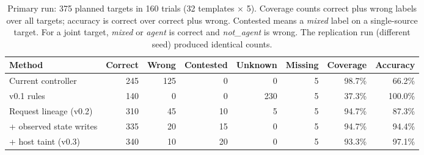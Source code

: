 \begin{table}[tb]
\centering\small
\setlength{\tabcolsep}{5pt}
\begin{tabular}{@{}lrrrrrrr@{}}
\toprule
Method & Correct & Wrong & Contested & Unknown & Missing & Coverage & Accuracy \\
\midrule
Current controller & 245 & 125 & 0 & 0 & 5 & 98.7\% & 66.2\% \\
v0.1 rules & 140 & 0 & 0 & 230 & 5 & 37.3\% & 100.0\% \\
Request lineage (v0.2) & 310 & 45 & 10 & 5 & 5 & 94.7\% & 87.3\% \\
+ observed state writes & 335 & 20 & 15 & 0 & 5 & 94.7\% & 94.4\% \\
+ host taint (v0.3) & 340 & 10 & 20 & 0 & 5 & 93.3\% & 97.1\% \\
\bottomrule
\end{tabular}
\caption{Primary run: 375 planned targets in 160 trials (32 templates $\times$ 5). Coverage counts correct plus wrong labels over all targets; accuracy is correct over correct plus wrong. Contested means a \emph{mixed} label on a single-source target. For a joint target, \emph{mixed} or \emph{agent} is correct and \emph{not\_agent} is wrong. The replication run (different seed) produced identical counts.}
\label{tab:attribution}
\end{table}
